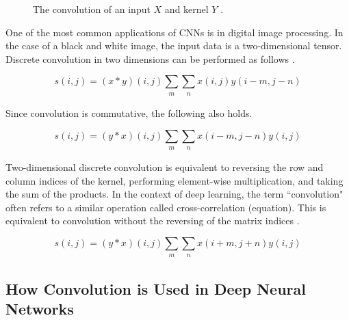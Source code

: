 \documentclass{article}
\begin{document}
\begin{figure}[h!]
    \caption{The convolution of an input \(X\) and kernel \(Y\) {\protect\cite{riebesell_tikz_2020}.}}
    \label{fig:conv-1d}
\end{figure}




One of the most common applications of CNNs is in digital image processing. In the case of a black and white image, the input data is a two-dimensional tensor. Discrete convolution in two dimensions can be performed as follows \cite{Goodfellow-et-al-2016}. %

\[s(i,j) = (x*y)(i,j)\sum\limits_{\substack{m}}\sum\limits_{\substack{n}} x(i,j)y(i-m,j-n)\]

Since convolution is commutative, the following also holds. 

\[s(i,j) = (y*x)(i,j)\sum\limits_{\substack{m}}\sum\limits_{\substack{n}} x(i-m,j-n)y(i,j)\]

Two-dimensional discrete convolution is equivalent to reversing the row and column indices of the kernel, performing element-wise multiplication, and taking the sum of the products. In the context of deep learning, the term ``convolution" often refers to a similar operation called cross-correlation (equation). This is equivalent to convolution without the reversing of the matrix indices \cite{Goodfellow-et-al-2016}. 

\[s(i,j) = (y*x)(i,j)\sum\limits_{\substack{m}}\sum\limits_{\substack{n}} x(i+m,j+n)y(i,j)\]

\subsection{How Convolution is Used in Deep Neural Networks}
\end{document}
